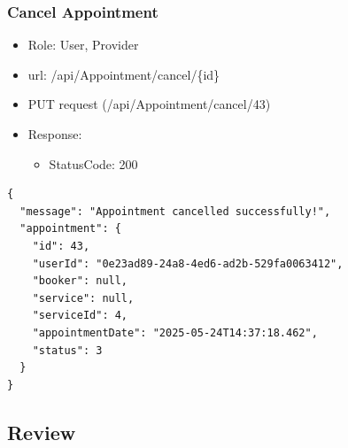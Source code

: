 \documentclass[11pt]{article}
\begin{document}
\subsubsection{Cancel Appointment}
\label{sec:org38e62e1}
\begin{itemize}
\item Role: User, Provider
\item url: /api/Appointment/cancel/\{id\}
\item PUT request (/api/Appointment/cancel/43)
\item Response:
\begin{itemize}
\item StatusCode: 200
\end{itemize}
\end{itemize}
\begin{verbatim}
{
  "message": "Appointment cancelled successfully!",
  "appointment": {
    "id": 43,
    "userId": "0e23ad89-24a8-4ed6-ad2b-529fa0063412",
    "booker": null,
    "service": null,
    "serviceId": 4,
    "appointmentDate": "2025-05-24T14:37:18.462",
    "status": 3
  }
}
\end{verbatim}
\subsection{Review}
\label{sec:org9fbe789}
\end{document}
